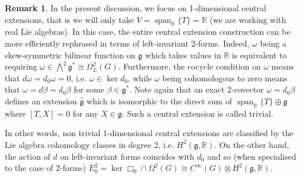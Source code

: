 \documentclass[dvipsnames]{amsart}
\theoremstyle{definition}
\newtheorem{remark}[theorem]{Remark}
\theoremstyle{definition}
\numberwithin{equation}{section}
\newcommand{\R}{\mathbb{R}}
\begin{document}
\begin{remark}\label{remark: V is 1-dimensional}
    In the present discussion, we focus on 1-dimensional central extensions, that is we will only take $V=\operatorname{span}_\mathbb{R}\{T\}=\mathbb R$ (we are working with real Lie algebras). In this case, the entire central extension construction can be more efficiently rephrased in terms of left-invariant 2-forms. Indeed, $\omega$ being a skew-symmetric bilinear function on $\mathfrak{g}$ which takes values in $\mathbb R$ is equivalent to requiring $\omega\in\bigwedge^2\mathfrak{g}^\ast\cong\Omega_L^2(G)$. Furthermore, the cocycle condition on $\omega$ means that $d\omega=d_0\omega=0$, i.e. $\omega\in\ker d_0$, while $\omega$ being cohomologous to zero means that $\omega=d\beta=d_0\beta$ for some $\beta\in\mathfrak{g}^\ast$. Note again that an exact 2-covector $\omega=d_0\beta$ defines an extension $\hat{\mathfrak{g}}$ which is isomorphic to the direct sum of $\operatorname{span}_{\mathbb R}\{T\}\oplus\mathfrak{g}$ where $[T,X]=0$ for any $X\in\mathfrak{g}$. Such a central extension is called trivial.  

    In other words, non trivial 1-dimensional central extensions are classified by the Lie algebra cohomology classes in degree 2, i.e. $H^2(\mathfrak{g},\mathbb R)$. On the other hand, the action of $d$ on left-invariant forms coincides with $d_0$ and so (when specialised to the case of 2-forms) $E_0^2=\ker\Box_0\cap\Omega^{2}(G)\cong C^\infty(G)\otimes H^2(\mathfrak{g},\R)$.
\end{remark}
\end{document}
